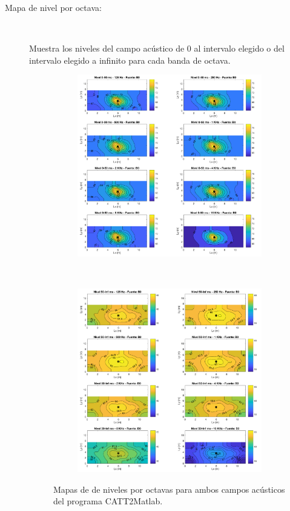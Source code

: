 \begin{description}
	\item[Mapa de nivel por octava:]~
	
	Muestra los niveles del campo acústico de 0 al intervalo elegido o del intervalo elegido a infinito para cada banda de octava.
	\begin{figure}[ht]
    \centering
    \begin{subfigure}[b]{0.3\textwidth}
    	\centering
        \includegraphics[width=0.9\linewidth]{archivos/capturas/niveloctava1}
    \end{subfigure}
    ~ %
    \begin{subfigure}[b]{0.3\textwidth}
    	\centering
        \includegraphics[width=0.9\linewidth]{archivos/capturas/niveloctava2}
    \end{subfigure}
    \caption{Mapas de de niveles por octavas para ambos campos acústicos del programa CATT2Matlab.}
\end{figure}
\FloatBarrier
	

\end{description}
